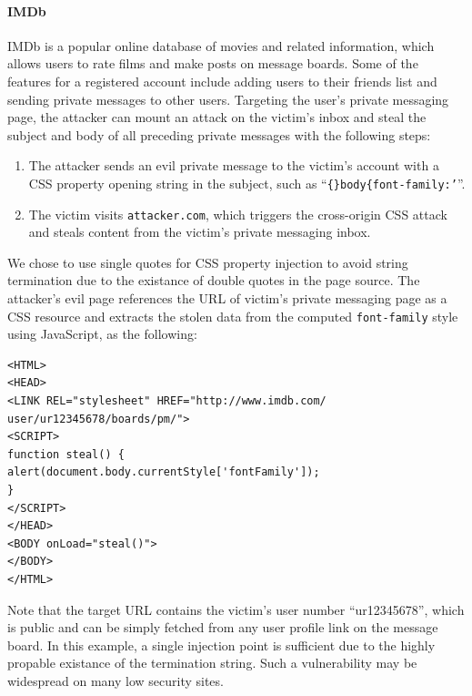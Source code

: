 \documentclass{acm_proc_article-sp}
\begin{document}
\paragraph{IMDb} IMDb is a popular online database of movies and related information, which allows users to rate films and make posts on message boards. Some of the features for a registered account include adding users to their friends list and sending private messages to other users. Targeting the user's private messaging page, the attacker can mount an attack on the victim's inbox and steal the subject and body of all preceding private messages with the following steps:
\begin{enumerate}
\item{The attacker sends an evil private message to the victim's account with a CSS property opening string in the subject, such as ``\texttt{\{\}body\{font-family:'}''.}
\item{The victim visits \texttt{attacker.com}, which triggers the cross-origin CSS attack and steals content from the victim's private messaging inbox.}
\end{enumerate}
We chose to use single quotes for CSS property injection to avoid string termination due to the existance of double quotes in the page source. The attacker's evil page references the URL of victim's private messaging page as a CSS resource and extracts the stolen data from the computed \texttt{font-family} style using JavaScript, as the following:
\begin{verbatim}
<HTML>
<HEAD>
<LINK REL="stylesheet" HREF="http://www.imdb.com/
user/ur12345678/boards/pm/">
<SCRIPT>
function steal() {
alert(document.body.currentStyle['fontFamily']);
}
</SCRIPT>
</HEAD>
<BODY onLoad="steal()">
</BODY>
</HTML>
\end{verbatim}
Note that the target URL contains the victim's user number ``ur12345678'', which is public and can be simply fetched from any user profile link on the message board. In this example, a single injection point is sufficient due to the highly propable existance of the termination string. Such a vulnerability may be widespread on many low security sites.
\end{document}
